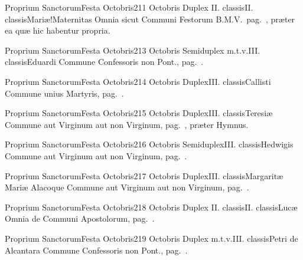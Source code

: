 \documentclass[nocturnale-romanum.tex]{subfiles}
\begin{document}
	{Proprium Sanctorum}{Festa Octobris}{2}{11 Octobris}
	{Duplex II. classis}{II. classis}{Mariæ!Maternitas}
	{Omnia sicut Communi Festorum B.M.V.\ pag.\ \pageref{M-CBMV}, præter ea quæ hic habentur propria.}
	{}
\tedeumrubric

	{Proprium Sanctorum}{Festa Octobris}{2}{13 Octobris}
	{Semiduplex m.t.v.}{III. classis}{Eduardi}
	{Commune Confessoris non Pont., pag.\ \pageref{M-CONP}.}
	{}

	{Proprium Sanctorum}{Festa Octobris}{2}{14 Octobris}
	{Duplex}{III. classis}{Callisti}
	{Commune unius Martyris, pag.\ \pageref{M-UMEX}.}
	{}

	{Proprium Sanctorum}{Festa Octobris}{2}{15 Octobris}
	{Duplex}{III. classis}{Teresiæ}
	{Commune aut Virginum aut non Virginum, pag.\ \pageref{M-MU}, præter Hymnus.}
	{}

	{Proprium Sanctorum}{Festa Octobris}{2}{16 Octobris}
	{Semiduplex}{III. classis}{Hedwigis}
	{Commune aut Virginum aut non Virginum, pag.\ \pageref{M-MU}.}
	{}

	{Proprium Sanctorum}{Festa Octobris}{2}{17 Octobris}
	{Duplex}{III. classis}{Margaritæ Mariæ Alacoque}
	{Commune aut Virginum aut non Virginum, pag.\ \pageref{M-MU}.}
	{}

	{Proprium Sanctorum}{Festa Octobris}{2}{18 Octobris}
	{Duplex II. classis}{II. classis}{Lucæ}
	{Omnia de Communi Apostolorum, pag.\ \pageref{M-APEX}.}
	{}

	{Proprium Sanctorum}{Festa Octobris}{2}{19 Octobris}
	{Duplex m.t.v.}{III. classis}{Petri de Alcantara}
	{Commune Confessoris non Pont., pag.\ \pageref{M-CONP}.}
	{}
\end{document}
